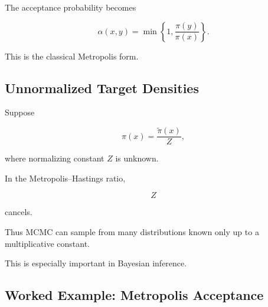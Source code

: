 The acceptance probability becomes

\[
\boxed{
\alpha(x,y)
=
\min
\left\{
1,
\frac{
\pi(y)
}{
\pi(x)
}
\right\}.
}
\]

This is the classical Metropolis form.

\subsection{Unnormalized Target Densities}
\label{subsec:unnormalized-mcmc-target}

Suppose

\[
\pi(x)
=
\frac{
\widetilde{\pi}(x)
}{
Z
},
\]

where normalizing constant \(Z\) is unknown.

In the Metropolis--Hastings ratio,

\[
Z
\]

cancels.

Thus MCMC can sample from many distributions known only up to a
multiplicative constant.

This is especially important in Bayesian inference.

\subsection{Worked Example: Metropolis Acceptance}
\label{subsec:worked-metropolis-acceptance}


